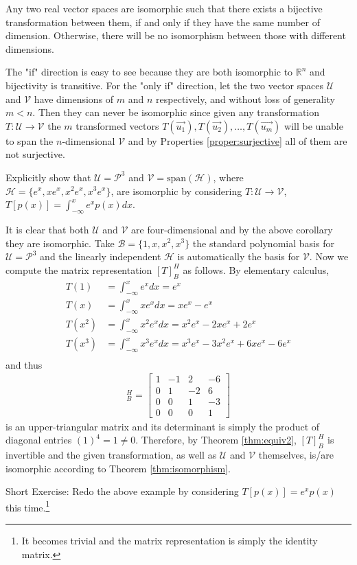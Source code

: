 \begin{proper}
Any two real vector spaces are isomorphic such that there exists a bijective transformation between them, if and only if they have the same number of dimension. Otherwise, there will be no isomorphism between those with different dimensions.
\end{proper}
The "if" direction is easy to see because they are both isomorphic to $\mathbb{R}^n$ and bijectivity is transitive. For the "only if" direction, let the two vector spaces $\mathcal{U}$ and $\mathcal{V}$ have dimensions of $m$ and $n$ respectively, and without loss of generality $m < n$. Then they can never be isomorphic since given any transformation $T: \mathcal{U} \to \mathcal{V}$ the $m$ transformed vectors $T(\vec{u_1}), T(\vec{u_2}), \ldots, T(\vec{u_m})$ will be unable to span the $n$-dimensional $\mathcal{V}$ and by Properties \ref{proper:surjective} all of them are not surjective.
\begin{exmp}
Explicitly show that $\mathcal{U} = \mathcal{P}^3$ and $\mathcal{V} = \text{span}(\mathcal{H})$, where $\mathcal{H} = \{e^x, xe^x, x^2e^x, x^3e^x\}$, are isomorphic by considering $T: \mathcal{U} \to \mathcal{V}$, $T[p(x)] = \int_{-\infty}^x e^x p(x) dx$.
\end{exmp}
\begin{solution}
It is clear that both $\mathcal{U}$ and $\mathcal{V}$ are four-dimensional and by the above corollary they are isomorphic. Take $\mathcal{B} = \{1, x, x^2, x^3\}$ the standard polynomial basis for $\mathcal{U} = \mathcal{P}^3$ and the linearly independent $\mathcal{H}$ is automatically the basis for $\mathcal{V}$. Now we compute the matrix representation $[T]_B^H$ as follows. By elementary calculus,
\begin{align*}
T(1) &= \int_{-\infty}^x e^x dx = e^x \\
T(x) &= \int_{-\infty}^x xe^x dx = xe^x - e^x \\
T(x^2) &= \int_{-\infty}^x x^2e^x dx = x^2e^x - 2xe^x + 2e^x \\
T(x^3) &= \int_{-\infty}^x x^3e^x dx = x^3e^x - 3x^2e^x + 6xe^x - 6e^x \\
\end{align*}
and thus
\begin{align*}
[T]_B^H = 
\begin{bmatrix}
1 & -1 & 2 & -6 \\ 
0 & 1 & -2 & 6 \\
0 & 0 & 1 & -3 \\
0 & 0 & 0 & 1
\end{bmatrix}
\end{align*}
is an upper-triangular matrix and its determinant is simply the product of diagonal entries $(1)^4 = 1 \neq 0$. Therefore, by Theorem \ref{thm:equiv2}, $[T]_B^H$ is invertible and the given transformation, as well as $\mathcal{U}$ and $\mathcal{V}$ themselves, is/are isomorphic according to Theorem \ref{thm:isomorphism}.
\end{solution}
Short Exercise: Redo the above example by considering $T[p(x)] = e^x p(x)$ this time.\footnote{It becomes trivial and the matrix representation is simply the identity matrix.}

